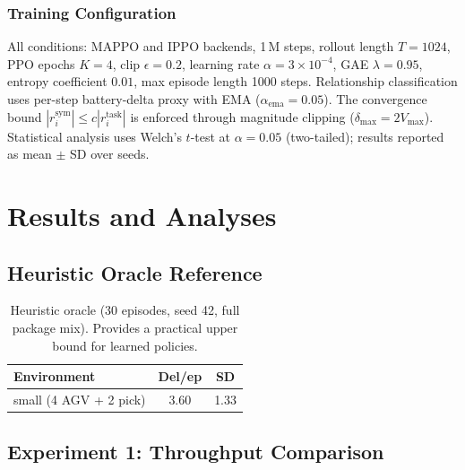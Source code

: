 \documentclass[Afour,sageh,times]{sagej}
\begin{document}
\subsubsection{Training Configuration}

All conditions: MAPPO and IPPO backends, 1\,M steps, rollout length $T = 1024$, PPO epochs $K = 4$, clip $\epsilon = 0.2$, learning rate $\alpha = 3\times10^{-4}$, GAE $\lambda = 0.95$, entropy coefficient $0.01$, max episode length 1000 steps. Relationship classification uses per-step battery-delta proxy with EMA ($\alpha_{\mathrm{ema}} = 0.05$). The convergence bound $|r_i^{\mathrm{sym}}| \le c|r_i^{\mathrm{task}}|$ is enforced through magnitude clipping ($\delta_{\max} = 2V_{\max}$). Statistical analysis uses Welch's $t$-test at $\alpha = 0.05$ (two-tailed); results reported as mean $\pm$ SD over seeds.

\section{Results and Analyses}
\label{sec:results}

\subsection{Heuristic Oracle Reference}

\begin{table}[htbp]
\centering
\caption{Heuristic oracle (30 episodes, seed 42, full package mix). Provides a practical upper bound for learned policies.}
\label{tab:heuristic}
\begin{tabular}{lcc}
\toprule
\textbf{Environment} & \textbf{Del/ep} & \textbf{SD} \\
\midrule
small (4 AGV + 2 pick) & 3.60 & 1.33 \\
\bottomrule
\end{tabular}
\end{table}

\subsection{Experiment 1: Throughput Comparison}
\end{document}
